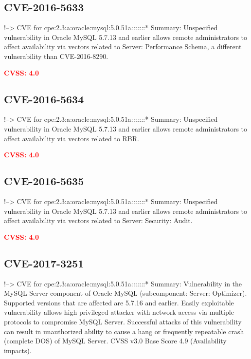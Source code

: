 \documentclass[a4paper, 12pt]{article}
\begin{document}
\hypertarget{cve-2016-5633}{%
\subsection{CVE-2016-5633}\label{cve-2016-5633}}

!--\textgreater{} CVE for
cpe:2.3:a:oracle:mysql:5.0.51a:\emph{:}:\emph{:}:\emph{:}:* Summary:
Unspecified vulnerability in Oracle MySQL 5.7.13 and earlier allows
remote administrators to affect availability via vectors related to
Server: Performance Schema, a different vulnerability than
CVE-2016-8290.

\textbf{\textcolor{red}{CVSS: 4.0}}

\hypertarget{cve-2016-5634}{%
\subsection{CVE-2016-5634}\label{cve-2016-5634}}

!--\textgreater{} CVE for
cpe:2.3:a:oracle:mysql:5.0.51a:\emph{:}:\emph{:}:\emph{:}:* Summary:
Unspecified vulnerability in Oracle MySQL 5.7.13 and earlier allows
remote administrators to affect availability via vectors related to RBR.

\textbf{\textcolor{red}{CVSS: 4.0}}

\hypertarget{cve-2016-5635}{%
\subsection{CVE-2016-5635}\label{cve-2016-5635}}

!--\textgreater{} CVE for
cpe:2.3:a:oracle:mysql:5.0.51a:\emph{:}:\emph{:}:\emph{:}:* Summary:
Unspecified vulnerability in Oracle MySQL 5.7.13 and earlier allows
remote administrators to affect availability via vectors related to
Server: Security: Audit.

\textbf{\textcolor{red}{CVSS: 4.0}}

\hypertarget{cve-2017-3251}{%
\subsection{CVE-2017-3251}\label{cve-2017-3251}}

!--\textgreater{} CVE for
cpe:2.3:a:oracle:mysql:5.0.51a:\emph{:}:\emph{:}:\emph{:}:* Summary:
Vulnerability in the MySQL Server component of Oracle MySQL
(subcomponent: Server: Optimizer). Supported versions that are affected
are 5.7.16 and earlier. Easily exploitable vulnerability allows high
privileged attacker with network access via multiple protocols to
compromise MySQL Server. Successful attacks of this vulnerability can
result in unauthorized ability to cause a hang or frequently repeatable
crash (complete DOS) of MySQL Server. CVSS v3.0 Base Score 4.9
(Availability impacts).
\end{document}

